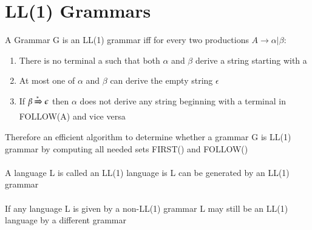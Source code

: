 \documentclass{article}[18pt]
\begin{document}
\section{LL(1) Grammars}
\begin{definition}[LL(1) Grammar]
A Grammar G is an LL(1) grammar iff for every two productions $A\rightarrow \alpha | \beta$:
\begin{enumerate}
	\item There is no terminal a such that both $\alpha$ and $\beta$ derive a string starting with a
	\item At most one of $\alpha$ and $\beta$ can derive the empty string $\epsilon$
	\item If $\beta \xRightarrow{*}\epsilon$ then $\alpha$ does not derive any string beginning with a terminal in FOLLOW(A) and vice versa
\end{enumerate}
\end{definition}
Therefore an efficient algorithm to determine whether a grammar G is LL(1) grammar by computing all needed sets FIRST() and FOLLOW()\\
\\
A language L is called an LL(1) language is L can be generated by an LL(1) grammar\\
\\
If any language L is given by a non-LL(1) grammar L may still be an LL(1) language by a different grammar
\end{document}
